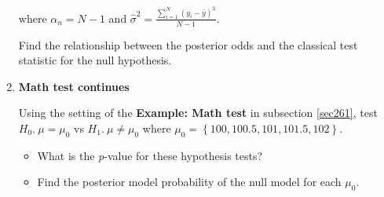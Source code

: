 \begin{enumerate}
where $\alpha_n=N-1$ and $\hat{\sigma}^2=\frac{\sum_{i=1}^N (y_i-\bar{y})^2}{N-1}$.

Find the relationship between the posterior odds and the classical test statistic for the null hypothesis.  

\item \textbf{Math test continues}

Using the setting of the \textbf{Example: Math test} in subsection \ref{sec261}, test $H_0. \ \mu=\mu_0$ vs $H_1. \ \mu \neq \mu_0$ where $\mu_0=\left\{100, 100.5, 101, 101.5, 102 \right\}$.

\begin{itemize}
	\item What is the \textit{p}-value for these hypothesis tests?
	\item Find the posterior model probability of the null model for each $\mu_0$.
\end{itemize} 

\end{enumerate}






